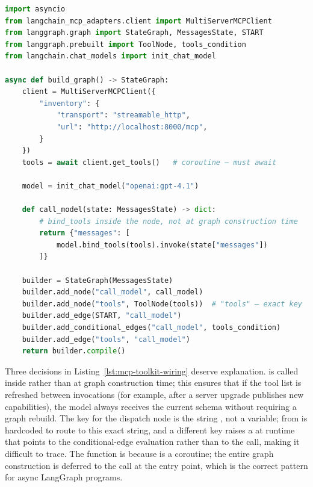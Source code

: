 \begin{lstlisting}[language=Python,
                   caption={Wiring \code{MultiServerMCPClient} to a LangGraph \code{StateGraph}},
                   label={lst:mcp-toolkit-wiring}]
import asyncio
from langchain_mcp_adapters.client import MultiServerMCPClient
from langgraph.graph import StateGraph, MessagesState, START
from langgraph.prebuilt import ToolNode, tools_condition
from langchain.chat_models import init_chat_model

async def build_graph() -> StateGraph:
    client = MultiServerMCPClient({
        "inventory": {
            "transport": "streamable_http",
            "url": "http://localhost:8000/mcp",
        }
    })
    tools = await client.get_tools()   # coroutine — must await

    model = init_chat_model("openai:gpt-4.1")

    def call_model(state: MessagesState) -> dict:
        # bind_tools inside the node, not at graph construction time
        return {"messages": [
            model.bind_tools(tools).invoke(state["messages"])
        ]}

    builder = StateGraph(MessagesState)
    builder.add_node("call_model", call_model)
    builder.add_node("tools", ToolNode(tools))  # "tools" — exact key
    builder.add_edge(START, "call_model")
    builder.add_conditional_edges("call_model", tools_condition)
    builder.add_edge("tools", "call_model")
    return builder.compile()
\end{lstlisting}

Three decisions in Listing~\ref{lst:mcp-toolkit-wiring} deserve
explanation.  is called inside
 rather than at graph construction time; this ensures
that if the tool list is refreshed between invocations (for example,
after a server upgrade publishes new capabilities), the model always
receives the current schema without requiring a graph rebuild.
The  key for the dispatch node is the string
, not a variable;  from
 is hardcoded to route to this exact string,
and a different key raises a  at runtime that points
to the conditional-edge evaluation rather than to the
 call, making it difficult to trace.
The  function is  because
 is a coroutine; the entire graph construction
is deferred to the  call at the entry point,
which is the correct pattern for async LangGraph programs.

